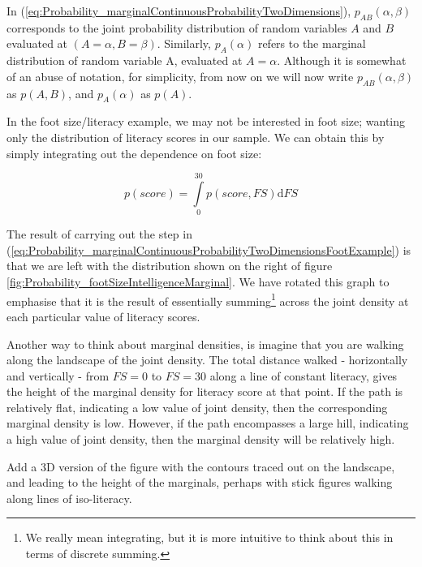 \documentclass[11pt,fullpage]{book}
\begin{document}
In (\ref{eq:Probability_marginalContinuousProbabilityTwoDimensions}), $p_{AB}(\alpha,\beta)$ corresponds to the joint probability distribution of random variables $A$ and $B$ evaluated at $(A=\alpha,B=\beta)$. Similarly, $p_A(\alpha)$ refers to the marginal distribution of random variable A, evaluated at $A=\alpha$. Although it is somewhat of an abuse of notation, for simplicity, from now on we will now write $p_{AB}(\alpha,\beta)$ as $p(A,B)$, and $p_A(\alpha)$ as $p(A)$.

In the foot size/literacy example, we may not be interested in foot size; wanting only the distribution of literacy scores in our sample. We can obtain this by simply integrating out the dependence on foot size:

\begin{equation}\label{eq:Probability_marginalContinuousProbabilityTwoDimensionsFootExample}
p(score) = \int\limits_{0}^{30} p(score,FS) \mathrm{d}FS
\end{equation}

The result of carrying out the step in (\ref{eq:Probability_marginalContinuousProbabilityTwoDimensionsFootExample}) is that we are left with the distribution shown on the right of figure \ref{fig:Probability_footSizeIntelligenceMarginal}. We have rotated this graph to emphasise that it is the result of essentially summing\footnote{We really mean integrating, but it is more intuitive to think about this in terms of discrete summing.} across the joint density at each particular value of literacy scores. 

Another way to think about marginal densities, is imagine that you are walking along the landscape of the joint density. The total distance walked - horizontally and vertically - from $FS=0$ to $FS=30$ along a line of constant literacy, gives the height of the marginal density for literacy score at that point. If the path is relatively flat, indicating a low value of joint density, then the corresponding marginal density is low. However, if the path encompasses a large hill, indicating a high value of joint density, then the marginal density will be relatively high.

Add a 3D version of the figure with the contours traced out on the landscape, and leading to the height of the marginals, perhaps with stick figures walking along lines of iso-literacy.
\end{document}
